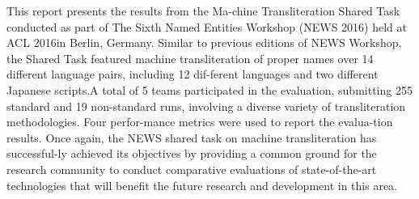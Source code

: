 This report presents the results from the Ma-chine Transliteration Shared Task conducted as part of The Sixth Named Entities Workshop (NEWS 2016) held at ACL 2016in Berlin, Germany. Similar to previous editions of NEWS Workshop, the Shared Task featured machine transliteration of proper names over 14 different language pairs, including 12 dif-ferent languages and two different Japanese scripts.A total of 5 teams participated in the evaluation, submitting 255 standard and 19 non-standard runs, involving a diverse variety of transliteration methodologies. Four perfor-mance metrics were used to report the evalua-tion results. Once again, the NEWS shared task on machine transliteration has successful-ly achieved its objectives by providing a common ground for the research community to conduct comparative evaluations of state-of-the-art technologies that will benefit the future research and development in this area.
